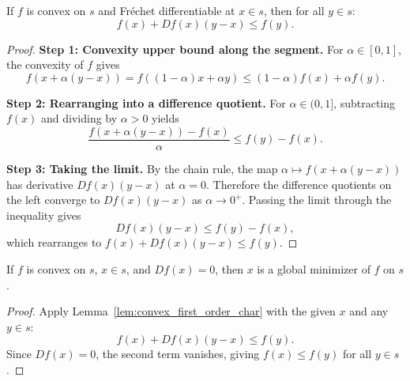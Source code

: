 
\begin{lemma}\label{lem:convex_first_order_char}
  \leanok{}
  \uses{}
  If $f$ is convex on $s$ and Fr\'echet differentiable at $x \in s$, then for all $y \in s$:
  \[
    f(x) + Df(x)(y - x) \le f(y).
  \]
\end{lemma}

\begin{proof}
  \leanok{}
  \textbf{Step 1: Convexity upper bound along the segment.}
  For $\alpha \in [0,1]$, the convexity of $f$ gives
  \[
    f(x + \alpha(y-x)) = f((1-\alpha)x + \alpha y) \le (1-\alpha)f(x) + \alpha f(y).
  \]

  \textbf{Step 2: Rearranging into a difference quotient.}
  For $\alpha \in (0,1]$, subtracting $f(x)$ and dividing by $\alpha > 0$ yields
  \[
    \frac{f(x + \alpha(y-x)) - f(x)}{\alpha} \le f(y) - f(x).
  \]

  \textbf{Step 3: Taking the limit.}
  By the chain rule, the map $\alpha \mapsto f(x + \alpha(y-x))$ has derivative $Df(x)(y-x)$ at $\alpha = 0$.
  Therefore the difference quotients on the left converge to $Df(x)(y-x)$ as $\alpha \to 0^+$.
  Passing the limit through the inequality gives
  \[
    Df(x)(y-x) \le f(y) - f(x),
  \]
  which rearranges to $f(x) + Df(x)(y-x) \le f(y)$.
\end{proof}


\begin{theorem}\label{thm:zero_deriv_implies_global_min}
  \leanok{}
  If $f$ is convex on $s$, $x \in s$, and $Df(x) = 0$, then $x$ is a global minimizer of $f$ on $s$.
\end{theorem}

\begin{proof}
  \leanok{}
  Apply Lemma~\ref{lem:convex_first_order_char} with the given $x$ and any $y \in s$:
  \[
    f(x) + Df(x)(y-x) \le f(y).
  \]
  Since $Df(x) = 0$, the second term vanishes, giving $f(x) \le f(y)$ for all $y \in s$.
\end{proof}

